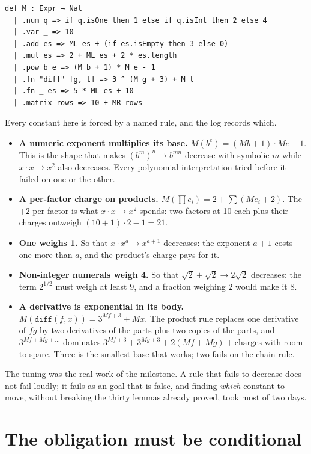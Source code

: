 \begin{verbatim}
def M : Expr → Nat
  | .num q => if q.isOne then 1 else if q.isInt then 2 else 4
  | .var _ => 10
  | .add es => ML es + (if es.isEmpty then 3 else 0)
  | .mul es => 2 + ML es + 2 * es.length
  | .pow b e => (M b + 1) * M e - 1
  | .fn "diff" [g, t] => 3 ^ (M g + 3) + M t
  | .fn _ es => 5 * ML es + 10
  | .matrix rows => 10 + MR rows
\end{verbatim}

Every constant here is forced by a named rule, and the log records which.

\begin{itemize}[nosep]
  \item \textbf{A numeric exponent multiplies its base.} $M(b^e) = (M b + 1) \cdot M e - 1$. This is
    the shape that makes $(b^m)^n \to b^{mn}$ decrease with symbolic $m$ while $x \cdot x \to x^2$
    also decreases. Every polynomial interpretation tried before it failed on one or the other.
  \item \textbf{A per-factor charge on products.} $M(\prod e_i) = 2 + \sum (M e_i + 2)$. The
    $+2$ per factor is what $x \cdot x \to x^2$ spends: two factors at 10 each plus their charges
    outweigh $(10+1) \cdot 2 - 1 = 21$.
  \item \textbf{One weighs 1.} So that $x \cdot x^a \to x^{a+1}$ decreases: the exponent $a+1$
    costs one more than $a$, and the product's charge pays for it.
  \item \textbf{Non-integer numerals weigh 4.} So that $\sqrt 2 + \sqrt 2 \to 2 \sqrt 2$
    decreases: the term $2^{1/2}$ must weigh at least $9$, and a fraction weighing $2$ would make
    it $8$.
  \item \textbf{A derivative is exponential in its body.} $M(\texttt{diff}(f, x)) = 3^{M f + 3} +
    M x$. The product rule replaces one derivative of $fg$ by two derivatives of the parts plus
    two copies of the parts, and $3^{M f + M g + \ldots}$ dominates $3^{M f + 3} + 3^{M g + 3} +
    2(M f + M g) + \text{charges}$ with room to spare. Three is the smallest base that works; two
    fails on the chain rule.
\end{itemize}

The tuning was the real work of the milestone. A rule that fails to decrease does not fail
loudly; it fails as an  goal that is false, and finding \emph{which} constant to move,
without breaking the thirty lemmas already proved, took most of two days.

\section{The obligation must be conditional}

